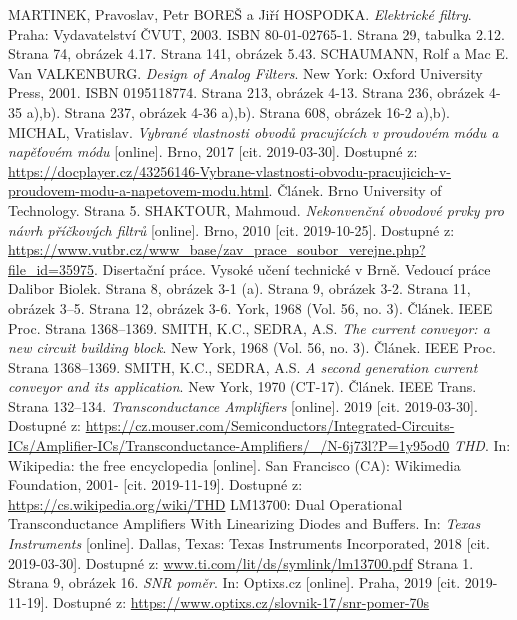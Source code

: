 \begin{thebibliography}{999}
MARTINEK, Pravoslav, Petr BOREŠ a Jiří HOSPODKA. \textit{Elektrické filtry}. Praha: Vydavatelství ČVUT, 2003. ISBN 80-01-02765-1. Strana 
29, tabulka 2.12. Strana 74, obrázek 4.17. Strana 141, obrázek 5.43.
SCHAUMANN, Rolf a Mac E. Van VALKENBURG. \textit{Design of Analog Filters}. New York: Oxford University Press, 2001. ISBN 0195118774. Strana 213, obrázek 4-13. Strana 236, obrázek 4-35 a),b). Strana 237, obrázek 4-36 a),b). Strana 608, obrázek 16-2 a),b).
MICHAL, Vratislav. \textit{Vybrané vlastnosti obvodů pracujících v proudovém módu a napěťovém módu} [online]. Brno, 2017 [cit. 2019-03-30]. Dostupné z: \url{https://docplayer.cz/43256146-Vybrane-vlastnosti-obvodu-pracujicich-v-proudovem-modu-a-napetovem-modu.html}. Článek. Brno University of Technology. Strana 5.
\renewcommand{\headrulewidth}{0pt}
\fancyhf{}
SHAKTOUR, Mahmoud. \textit{Nekonvenční obvodové prvky pro návrh příčkových filtrů} [online]. Brno, 2010 [cit. 2019-10-25]. Dostupné z: \url{https://www.vutbr.cz/www_base/zav_prace_soubor_verejne.php?file_id=35975}. Disertační práce. Vysoké učení technické v Brně. Vedoucí práce Dalibor Biolek. Strana 8, obrázek 3-1 (a). Strana 9, obrázek 3-2. Strana 11, obrázek 3--5. Strana 12, obrázek 3-6.
York, 1968 (Vol. 56, no. 3). Článek. IEEE Proc. Strana 1368--1369.
SMITH, K.C., SEDRA, A.S. \textit{The current conveyor: a new circuit building block}. New York, 1968 (Vol. 56, no. 3). Článek. IEEE Proc. Strana 1368--1369.
SMITH, K.C., SEDRA, A.S. \textit{A second generation current conveyor and its application}. New York, 1970 (CT-17). Článek. IEEE Trans. Strana 132--134.
\textit{Transconductance Amplifiers} [online]. 2019 [cit. 2019-03-30]. Dostupné z: \url{https://cz.mouser.com/Semiconductors/Integrated-Circuits-ICs/Amplifier-ICs/Transconductance-Amplifiers/_/N-6j73l?P=1y95od0}
\textit{THD}. In: Wikipedia: the free encyclopedia [online]. San Francisco (CA): Wikimedia Foundation, 2001- [cit. 2019-11-19]. Dostupné z: \url{https://cs.wikipedia.org/wiki/THD}
LM13700: Dual Operational Transconductance Amplifiers With Linearizing Diodes and Buffers. In: \textit{Texas Instruments} [online]. Dallas, Texas: Texas Instruments Incorporated, 2018 [cit. 2019-03-30]. Dostupné z: \url{www.ti.com/lit/ds/symlink/lm13700.pdf} Strana 1. Strana 9, obrázek 16.
\renewcommand{\headrulewidth}{0pt}
\fancyhf{}
\textit{SNR poměr}. In: Optixs.cz [online]. Praha, 2019 [cit. 2019-11-19]. Dostupné z: \url{https://www.optixs.cz/slovnik-17/snr-pomer-70s}

\end{thebibliography}
